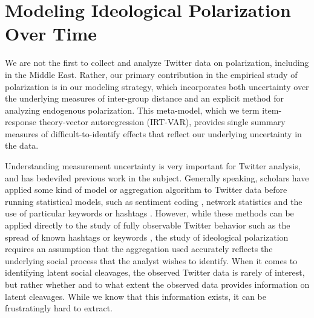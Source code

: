 \documentclass[12pt]{article}
\begin{document}
\section*{Modeling Ideological Polarization Over Time}

We are not the first to collect and analyze Twitter data on polarization, including in the Middle East. Rather, our primary contribution in the empirical study of polarization is in our modeling strategy, which incorporates both uncertainty over the underlying measures of inter-group distance and an explicit method for analyzing endogenous polarization. This meta-model, which we term item-response theory-vector autoregression (IRT-VAR), provides single summary measures of difficult-to-identify effects that reflect our underlying uncertainty in the data.

Understanding measurement uncertainty is very important for Twitter analysis, and has bedeviled previous work in the subject. Generally speaking, scholars have applied some kind of model or aggregation algorithm to Twitter data before running statistical models, such as sentiment coding \parencite{jamaletal2015,siegel2018}, network statistics \parencite{freelon2015} and the use of particular keywords or hashtags \parencite{weber2013}. However, while these methods can be applied directly to the study of fully observable Twitter behavior such as the spread of known hashtags or keywords \parencite{threlkeld2017}, the study of ideological polarization requires an assumption that the aggregation used accurately reflects the underlying social process that the analyst wishes to identify. When it comes to identifying latent social cleavages, the observed Twitter data is rarely of interest, but rather whether and to what extent the observed data provides information on latent cleavages. While we know that this information exists, it can be frustratingly hard to extract.
\end{document}
